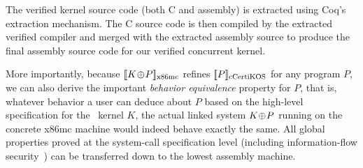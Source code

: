 The verified kernel source code (both C and assembly) is extracted using 
Coq's extraction mechanism. The C source code is then compiled by the
extracted verified compiler and merged with the extracted assembly source to
produce the final assembly source code for our verified concurrent kernel. 


More importantly, because $\sem{\rm{}x86mc}{K\join{}P}$ refines
$\sem{\rm\cCTOS}{P}$ for any program $P$, we can also derive the
important {\em behavior equivalence} property for $P$, that is,
whatever behavior a user can deduce about $P$ based on the high-level
specification for the \cCTOS\ kernel $K$, the actual linked
system $K\join{}P$ running on the concrete x86mc machine would indeed
behave exactly the same.  All global properties proved at the
system-call specification level (including information-flow
security~\cite{costanzo16}) can be transferred down to the lowest
assembly machine.








